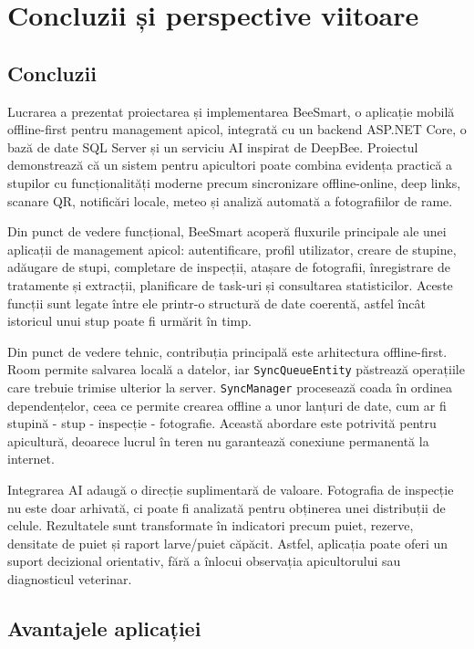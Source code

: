\chapter{Concluzii și perspective viitoare}
\label{chap:concluzii}

\section{Concluzii}

Lucrarea a prezentat proiectarea și implementarea BeeSmart, o aplicație mobilă offline-first pentru management apicol, integrată cu un backend ASP.NET Core, o bază de date SQL Server și un serviciu AI inspirat de DeepBee. Proiectul demonstrează că un sistem pentru apicultori poate combina evidența practică a stupilor cu funcționalități moderne precum sincronizare offline-online, deep links, scanare QR, notificări locale, meteo și analiză automată a fotografiilor de rame.

Din punct de vedere funcțional, BeeSmart acoperă fluxurile principale ale unei aplicații de management apicol: autentificare, profil utilizator, creare de stupine, adăugare de stupi, completare de inspecții, atașare de fotografii, înregistrare de tratamente și extracții, planificare de task-uri și consultarea statisticilor. Aceste funcții sunt legate între ele printr-o structură de date coerentă, astfel încât istoricul unui stup poate fi urmărit în timp.

Din punct de vedere tehnic, contribuția principală este arhitectura offline-first. Room permite salvarea locală a datelor, iar \texttt{SyncQueueEntity} păstrează operațiile care trebuie trimise ulterior la server. \texttt{SyncManager} procesează coada în ordinea dependențelor, ceea ce permite crearea offline a unor lanțuri de date, cum ar fi stupină - stup - inspecție - fotografie. Această abordare este potrivită pentru apicultură, deoarece lucrul în teren nu garantează conexiune permanentă la internet.

Integrarea AI adaugă o direcție suplimentară de valoare. Fotografia de inspecție nu este doar arhivată, ci poate fi analizată pentru obținerea unei distribuții de celule. Rezultatele sunt transformate în indicatori precum puiet, rezerve, densitate de puiet și raport larve/puiet căpăcit. Astfel, aplicația poate oferi un suport decizional orientativ, fără a înlocui observația apicultorului sau diagnosticul veterinar.

\section{Avantajele aplicației}

